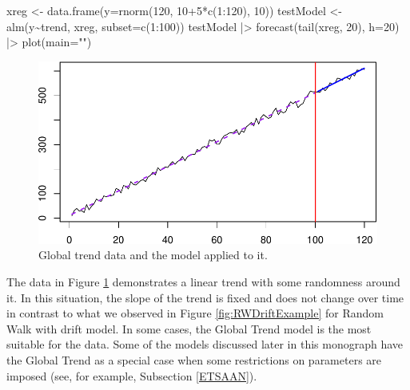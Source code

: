 \documentclass[
]{book}
\newenvironment{Shaded}{\begin{snugshade}}{\end{snugshade}}
\newcommand{\AttributeTok}[1]{\textcolor[rgb]{0.77,0.63,0.00}{#1}}
\newcommand{\DecValTok}[1]{\textcolor[rgb]{0.00,0.00,0.81}{#1}}
\newcommand{\FunctionTok}[1]{\textcolor[rgb]{0.00,0.00,0.00}{#1}}
\newcommand{\NormalTok}[1]{#1}
\newcommand{\OtherTok}[1]{\textcolor[rgb]{0.56,0.35,0.01}{#1}}
\newcommand{\SpecialCharTok}[1]{\textcolor[rgb]{0.00,0.00,0.00}{#1}}
\newcommand{\StringTok}[1]{\textcolor[rgb]{0.31,0.60,0.02}{#1}}
\theoremstyle{definition}
\theoremstyle{definition}
\theoremstyle{definition}
\theoremstyle{definition}
\theoremstyle{remark}
\begin{document}
\begin{Shaded}
\begin{Highlighting}[]
\NormalTok{xreg }\OtherTok{\textless{}{-}} \FunctionTok{data.frame}\NormalTok{(}\AttributeTok{y=}\FunctionTok{rnorm}\NormalTok{(}\DecValTok{120}\NormalTok{, }\DecValTok{10}\SpecialCharTok{+}\DecValTok{5}\SpecialCharTok{*}\FunctionTok{c}\NormalTok{(}\DecValTok{1}\SpecialCharTok{:}\DecValTok{120}\NormalTok{), }\DecValTok{10}\NormalTok{))}
\NormalTok{testModel }\OtherTok{\textless{}{-}} \FunctionTok{alm}\NormalTok{(y}\SpecialCharTok{\textasciitilde{}}\NormalTok{trend, xreg, }\AttributeTok{subset=}\FunctionTok{c}\NormalTok{(}\DecValTok{1}\SpecialCharTok{:}\DecValTok{100}\NormalTok{))}
\NormalTok{testModel }\SpecialCharTok{|\textgreater{}}
  \FunctionTok{forecast}\NormalTok{(}\FunctionTok{tail}\NormalTok{(xreg, }\DecValTok{20}\NormalTok{), }\AttributeTok{h=}\DecValTok{20}\NormalTok{) }\SpecialCharTok{|\textgreater{}}
  \FunctionTok{plot}\NormalTok{(}\AttributeTok{main=}\StringTok{""}\NormalTok{)}
\end{Highlighting}
\end{Shaded}

\begin{figure}
\centering
\includegraphics{Svetunkov--2022----ADAM_files/figure-latex/GlobalTrendExample-1.pdf}
\caption{\label{fig:GlobalTrendExample}Global trend data and the model applied to it.}
\end{figure}

The data in Figure \ref{fig:GlobalTrendExample} demonstrates a linear trend with some randomness around it. In this situation, the slope of the trend is fixed and does not change over time in contrast to what we observed in Figure \ref{fig:RWDriftExample} for Random Walk with drift model. In some cases, the Global Trend model is the most suitable for the data. Some of the models discussed later in this monograph have the Global Trend as a special case when some restrictions on parameters are imposed (see, for example, Subsection \ref{ETSAAN}).
\end{document}
